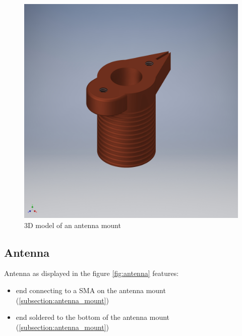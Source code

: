\begin{figure}[h]
	\centering
	\includegraphics[width=\textwidth]{images/antenna_mount}
	\caption{3D model of an antenna mount}
	\label{fig:antenna_mount}
\end{figure}

\clearpage
\subsection{Antenna}
\label{subsection:antenna}
Antenna as displayed in the figure \ref{fig:antenna} features:
\begin{itemize}
	\item end connecting to a SMA on the antenna mount (\ref{subsection:antenna_mount})
	\item end soldered to the bottom of the antenna mount (\ref{subsection:antenna_mount})
\end{itemize}

